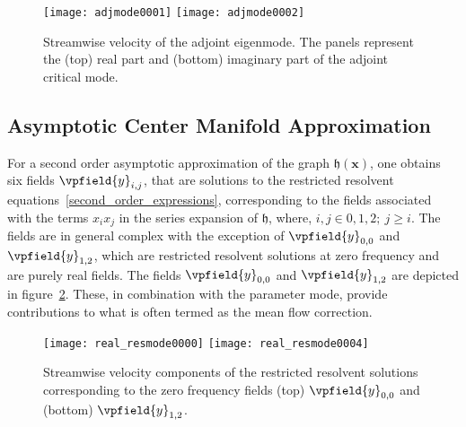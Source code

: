 \begin{figure}
	\texttt{[image: adjmode0001]}
	\texttt{[image: adjmode0002]}
	\caption{Streamwise velocity of the adjoint eigenmode. The panels represent the (top) real part and (bottom) imaginary part of the adjoint critical mode.}
	\label{fig:flowconfig_2}
\end{figure}


\subsection{Asymptotic Center Manifold Approximation}

For a second order asymptotic approximation of the graph $\mathfrak{h}(\mathbf{x})$, one obtains six fields $\vpfield{y}_{i,j}$, that are solutions to the restricted resolvent equations~\eqref{second_order_expressions}, corresponding to the fields associated with the terms $x_{i}x_{j}$ in the series expansion of $\mathfrak{h}$, where, $i,j\in 0,1,2;\ j \ge i $. The fields are in general complex with the exception of $\vpfield{y}_{0,0}$ and $\vpfield{y}_{1,2}$, which are restricted resolvent solutions at zero frequency and are purely real fields. The fields $\vpfield{y}_{0,0}$ and $\vpfield{y}_{1,2}$ are depicted in figure~\ref{fig:resolvents_zero}. These, in combination with the parameter mode, provide contributions to what is often termed as the mean flow correction.
\begin{figure}
	\centering
	\texttt{[image: real\_resmode0000]}
	\texttt{[image: real\_resmode0004]}							
	\caption{Streamwise velocity components of the restricted resolvent solutions corresponding to the zero frequency fields (top) $\vpfield{y}_{0,0}$ and (bottom) $\vpfield{y}_{1,2}$.}
	\label{fig:resolvents_zero}
\end{figure}

